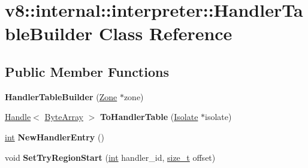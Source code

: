 \hypertarget{classv8_1_1internal_1_1interpreter_1_1HandlerTableBuilder}{}\section{v8\+:\+:internal\+:\+:interpreter\+:\+:Handler\+Table\+Builder Class Reference}
\label{classv8_1_1internal_1_1interpreter_1_1HandlerTableBuilder}
\subsection*{Public Member Functions}
\begin{DoxyCompactItemize}
\item 
\mbox{\label{classv8_1_1internal_1_1interpreter_1_1HandlerTableBuilder_a6627b2e006e6a55ce940b58c8edfddf2}} 
{\bfseries Handler\+Table\+Builder} (\mbox{\hyperlink{classv8_1_1internal_1_1Zone}{Zone}} $\ast$zone)
\item 
\mbox{\label{classv8_1_1internal_1_1interpreter_1_1HandlerTableBuilder_ac5556aafb29c2dc15cbede125278a3a1}} 
\mbox{\hyperlink{classv8_1_1internal_1_1Handle}{Handle}}$<$ \mbox{\hyperlink{classv8_1_1internal_1_1ByteArray}{Byte\+Array}} $>$ {\bfseries To\+Handler\+Table} (\mbox{\hyperlink{classv8_1_1internal_1_1Isolate}{Isolate}} $\ast$isolate)
\item 
\mbox{\label{classv8_1_1internal_1_1interpreter_1_1HandlerTableBuilder_aeaa077d7683bba9ef16516c2304f5c87}} 
\mbox{\hyperlink{classint}{int}} {\bfseries New\+Handler\+Entry} ()
\item 
\mbox{\label{classv8_1_1internal_1_1interpreter_1_1HandlerTableBuilder_a44e4050f8feeb5917c895f812897b665}} 
void {\bfseries Set\+Try\+Region\+Start} (\mbox{\hyperlink{classint}{int}} handler\+\_\+id, \mbox{\hyperlink{classsize__t}{size\+\_\+t}} offset)
\item 
\mbox{\label{classv8_1_1internal_1_1interpreter_1_1HandlerTableBuilder_afacf3667fd2b30938af3a6cd959ce87f}} 

\end{DoxyCompactItemize}
